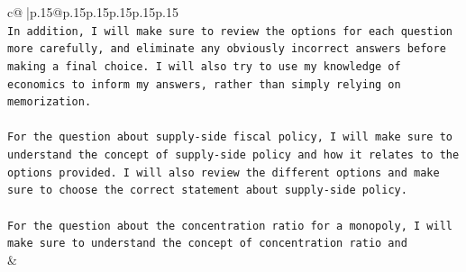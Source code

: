 \documentclass{article}
\begin{document}
{\begin{supertabular}{c@{$\;$}|p{.15\linewidth}@{}p{.15\linewidth}p{.15\linewidth}p{.15\linewidth}p{.15\linewidth}p{.15\linewidth}}
{{{\\ 
\texttt{In addition, I will make sure to review the options for each question more carefully, and eliminate any obviously incorrect answers before making a final choice. I will also try to use my knowledge of economics to inform my answers, rather than simply relying on memorization.} \\
\\ 
\texttt{For the question about supply{-}side fiscal policy, I will make sure to understand the concept of supply{-}side policy and how it relates to the options provided. I will also review the different options and make sure to choose the correct statement about supply{-}side policy.} \\
\\ 
\texttt{For the question about the concentration ratio for a monopoly, I will make sure to understand the concept of concentration ratio and} \\
            }
        }
    }
    & \\ \\

\end{supertabular}
}
\end{document}
